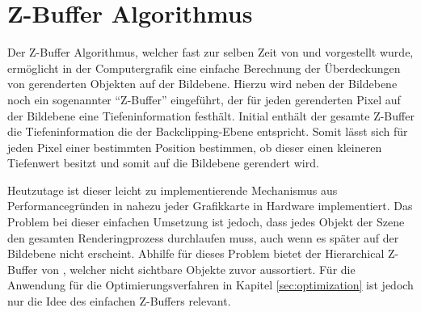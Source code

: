 
\section{Z-Buffer Algorithmus} \label{sec:z-buffer}

Der Z-Buffer Algorithmus, welcher fast zur selben Zeit von \citet{straber1974schnelle} und \citet{catmull1974subdivision} vorgestellt wurde, ermöglicht in der Computergrafik eine einfache Berechnung der Überdeckungen von gerenderten Objekten auf der Bildebene. Hierzu wird neben der Bildebene noch ein sogenannter \enquote{Z-Buffer} eingeführt, der für jeden gerenderten Pixel auf der Bildebene eine Tiefeninformation festhält. Initial enthält der gesamte Z-Buffer die Tiefeninformation die der Backclipping-Ebene entspricht. Somit lässt sich für jeden Pixel einer bestimmten Position bestimmen, ob dieser einen kleineren Tiefenwert besitzt und somit auf die Bildebene gerendert wird. 

Heutzutage ist dieser leicht zu implementierende Mechanismus aus Performancegründen in nahezu jeder Grafikkarte in Hardware implementiert. Das Problem bei dieser einfachen Umsetzung ist jedoch, dass jedes Objekt der Szene den gesamten Renderingprozess durchlaufen muss, auch wenn es später auf der Bildebene nicht erscheint. Abhilfe für dieses Problem bietet der Hierarchical Z-Buffer von \citet{greene1993hierarchical}, welcher nicht sichtbare Objekte zuvor aussortiert. Für die Anwendung für die Optimierungsverfahren in Kapitel \ref{sec:optimization} ist jedoch nur die Idee des einfachen Z-Buffers relevant.
